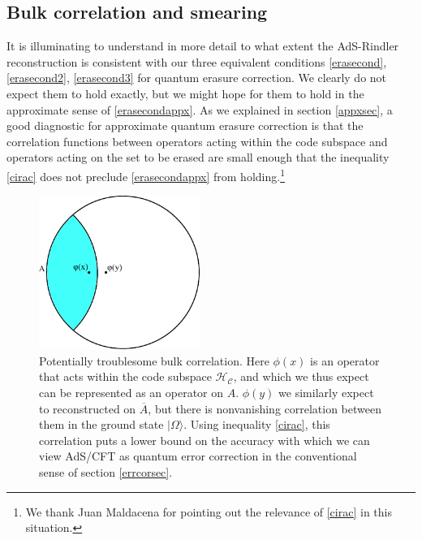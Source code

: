 \documentclass[12pt]{article}
\newcommand{\HC}{\mathcal{H}_{\mathcal{C}}}
\newcommand{\ran}{\rangle}
\newcommand{\ol}{\overline}
\begin{document}
\subsection{Bulk correlation and smearing}\label{bcs}
It is illuminating to understand in more detail to what extent the AdS-Rindler reconstruction is consistent with our three equivalent conditions \eqref{erasecond}, \eqref{erasecond2}, \eqref{erasecond3} for quantum erasure correction.  We clearly do not expect them to hold exactly, but we might hope for them to hold in the approximate sense of \eqref{erasecondappx}.  As we explained in section \ref{appxsec}, a good diagnostic for approximate quantum erasure correction is that the correlation functions between operators acting within the code subspace and operators acting on the set to be erased are small enough that the inequality \eqref{cirac} does not preclude \eqref{erasecondappx} from holding.\footnote{We thank Juan Maldacena for pointing out the relevance of \eqref{cirac} in this situation.}  
\begin{figure}
\begin{center}
\includegraphics[height=5cm]{corrfig.pdf}
\caption{Potentially troublesome bulk correlation.  Here $\phi(x)$ is an operator that acts within the code subspace $\HC$, and which we thus expect can be represented as an operator on $A$.  $\phi(y)$ we similarly expect to reconstructed on $\ol{A}$, but there is nonvanishing correlation between them in the ground state $|\Omega\ran$.  Using inequality \eqref{cirac}, this correlation puts a lower bound on the accuracy with which we can view AdS/CFT as quantum error correction in the conventional sense of section \ref{errcorsec}.}\label{corrfig}
\end{center}
\end{figure}
\end{document}
